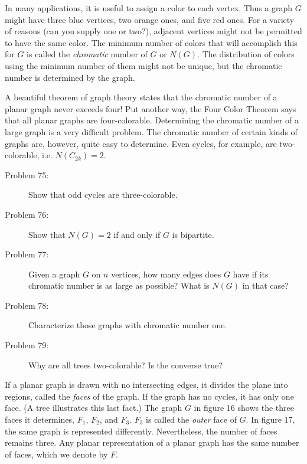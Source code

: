 \documentclass{article}
\begin{document}
In many applications, it is useful to assign a color to each vertex. Thus a graph $G$ might have three blue vertices, two orange ones, and five red ones. For a variety of reasons (can you supply one or two?), adjacent vertices might not be permitted to have the same color. The minimum number of colors that will accomplish this for $G$ is called the \emph{chromatic} number of $G$ or $N(G)$. The distribution of colors using the minimum number of them might not be unique, but the chromatic number is determined by the graph. 

A beautiful theorem of graph theory states that the chromatic number of a planar graph never exceeds four! Put another way, the Four Color Theorem says that all planar graphs are four-colorable. Determining the chromatic number of a large graph is a very difficult problem. The chromatic number of certain kinds of graphs are, however, quite easy to determine. Even cycles, for example, are two-colorable, i.e. $N(C_{2k})=2$.

\begin{description}

\item[Problem 75:] Show that odd cycles are three-colorable.

\item[Problem 76:] Show that $N(G)=2$ if and only if $G$ is bipartite.

\item[Problem 77:] Given a graph $G$ on $n$ vertices, how many edges does $G$ have if its chromatic number is as large as possible? What is $N(G)$ in that case?

\item[Problem 78:] Characterize those graphs with chromatic number one.

\item[Problem 79:] Why are all trees two-colorable? Is the converse true?

\end{description}

If a planar graph is drawn with no intersecting edges, it divides the plane into regions, called the \emph{faces} of the graph. If the graph has no cycles, it has only one face. (A tree illustrates this last fact.) The graph $G$ in figure 16 shows the three faces it determines, $F_1$, $F_2$, and $F_3$. $F_3$ is called the \emph{outer} face of $G$. In figure 17, the same graph is represented differently. Nevertheless, the number of faces remains three. Any planar representation of a planar graph has the same number of faces, which we denote by $F$. 
\end{document}
